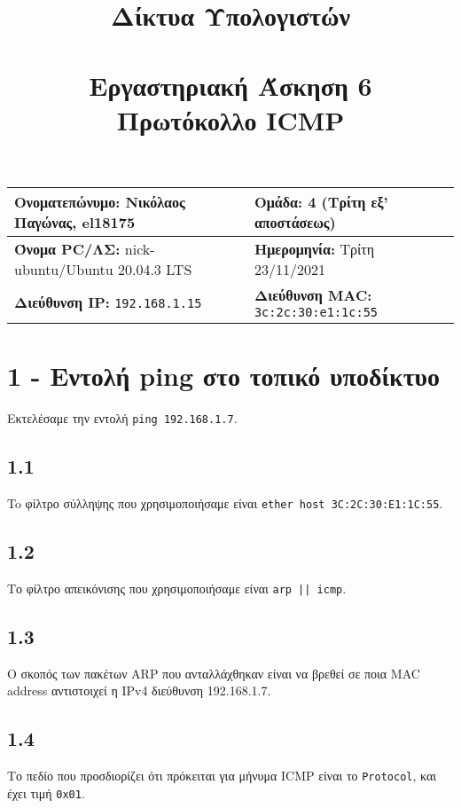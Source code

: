 

\newcommand{\imagesPath}{.}

\title{
	\textbf{Δίκτυα Υπολογιστών} \\~\\
	Εργαστηριακή Άσκηση 6 \\ 
	Πρωτόκολλο ICMP 
}
\author{}
\date{}


	\maketitle
	
	\begin{tabular}{|l|l|}
		\hline
		\textbf{Ονοματεπώνυμο:} Νικόλαος Παγώνας, el18175 & \textbf{Ομάδα:} 4 (Τρίτη εξ' αποστάσεως) \\
		\hline
		\textbf{Όνομα PC/ΛΣ:} nick-ubuntu/Ubuntu 20.04.3 LTS & \textbf{Ημερομηνία:} Τρίτη 23/11/2021\\
		\hline
		\textbf{Διεύθυνση IP:} \verb|192.168.1.15| & \textbf{Διεύθυνση MAC:} \verb|3c:2c:30:e1:1c:55|\\
		\hline
	\end{tabular}

	\section*{1 - Εντολή ping στο τοπικό υποδίκτυο}
		Εκτελέσαμε την εντολή  \verb|ping 192.168.1.7|.
		
		\subsection*{1.1}
			To φίλτρο σύλληψης που χρησιμοποιήσαμε είναι \verb|ether host 3C:2C:30:E1:1C:55|.
		
		\subsection*{1.2}
			Το φίλτρο απεικόνισης που χρησιμοποιήσαμε είναι \verb+arp || icmp+.
		
		\subsection*{1.3}
			Ο σκοπός των πακέτων ARP που ανταλλάχθηκαν είναι να βρεθεί σε ποια MAC address αντιστοιχεί η IPv4 διεύθυνση 192.168.1.7.
		
		\subsection*{1.4}
			Το πεδίο που προσδιορίζει ότι πρόκειται για μήνυμα ICMP είναι το \verb|Protocol|, και έχει τιμή \verb|0x01|.
	
